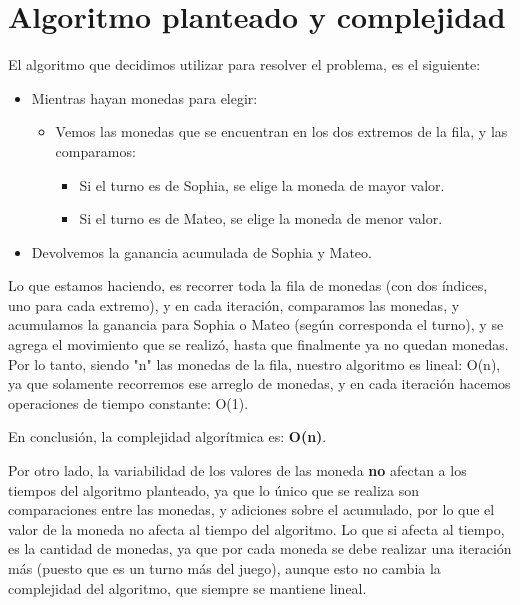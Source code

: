 \section{Algoritmo planteado y complejidad}

El algoritmo que decidimos utilizar para resolver el problema, es el siguiente:
\begin {itemize}
\item Mientras hayan monedas para elegir:
    \begin {itemize}
    \item Vemos las monedas que se encuentran en los dos extremos de la fila, y las comparamos:
        \begin {itemize}
        \item Si el turno es de Sophia, se elige la moneda de mayor valor.
        \item Si el turno es de Mateo, se elige la moneda de menor valor.
        \end {itemize}
    \end {itemize}
\item Devolvemos la ganancia acumulada de Sophia y Mateo.
\end {itemize}

Lo que estamos haciendo, es recorrer toda la fila de monedas (con dos índices, uno para cada extremo), y en cada iteración, comparamos las monedas, y acumulamos la ganancia para Sophia o Mateo (según corresponda el turno), y se agrega el movimiento que se realizó, hasta que finalmente ya no quedan monedas. Por lo tanto, siendo "n" las monedas de la fila, nuestro algoritmo es lineal: O(n), ya que solamente recorremos ese arreglo de monedas, y en cada iteración hacemos operaciones de tiempo constante: O(1).

En conclusión, la complejidad algorítmica es: \textbf{O(n)}.

Por otro lado, la variabilidad de los valores de las moneda \textbf{no} afectan a los tiempos del algoritmo planteado, ya que lo único que se realiza son comparaciones entre las monedas, y adiciones sobre el acumulado, por lo que el valor de la moneda no afecta al tiempo del algoritmo. Lo que si afecta al tiempo, es la cantidad de monedas, ya que por cada moneda se debe realizar una iteración más (puesto que es un turno más del juego), aunque esto no cambia la complejidad del algoritmo, que siempre se mantiene lineal.